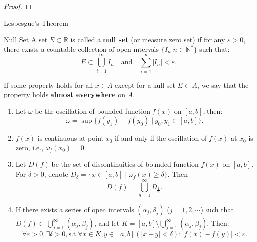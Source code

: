 \documentclass[11pt]{../../TexTemplate/elegantbook}
\begin{document}
\begin{proof}
    
\end{proof}

\begin{leftbarTitle}{Lesbesgue's Theorem}\end{leftbarTitle}
\begin{definition}{Null Set}
    A set \( E \subset \mathbb{R} \) is called a \textbf{null set} (or measure zero set) 
    if for any \( \varepsilon > 0 \), there exists a countable collection of open intervals 
    \( \{ I_{n}|n \in \mathbb{N}^{*} \} \) such that:
    \[
    E \subset \bigcup_{i=1}^{\infty} I_{n} \quad \text{and} \quad \sum_{i=1}^{\infty} |I_{n}| < \varepsilon.
    \]
\end{definition}
If some property holds for all \( x \in A \) except for a null set \( E \subset A \),
we say that the property holds \textbf{almost everywhere} on \( A \).

\begin{lemma}
    \begin{enumerate}
        \item Let \( \omega \) be the oscillation of bounded function \( f(x) \) on \( [a, b] \), then:
            \[
            \omega = \sup \{ f(y_{1}) - f(y_{0}) \mid y_{0}, y_{1} \in [a, b] \}  .
            \]
        \item \(f(x)\) is continuous at point \( x_{0} \) if and only if 
            the oscillation of \( f(x) \) at \( x_{0} \) is zero, i.e., \( \omega_{f}(x_{0}) = 0 \).
        \item Let \(D(f)\) be the set of discontinuities of bounded function \( f(x) \) on \( [a, b] \). 
            For \(\delta > 0\), denote \(D_{\delta}= \{ x \in [a,b] \mid \omega_{f}(x) \geqslant \delta \}\).
            Then 
            \[
            D(f) = \bigcup_{n=1}^{\infty} D_{\frac{1}{n}}.
            \]
        \item If there exists a series of open intervals \( (\alpha_{j}, \beta_{j}) \) (\( j = 1, 2, \cdots \)) 
            such that \(D(f) \subset \bigcup_{j=1}^{\infty} (\alpha_{j}, \beta_{j})\), 
            and let \(K = [a,b]\setminus \bigcup_{j=1}^{\infty} (\alpha_{j}, \beta_{j})\).
            Then:
            \[
            \forall \varepsilon > 0, \exists \delta > 0, \text{s.t.} \forall x \in K, y \in [a,b] (|x - y| < \delta):
            |f(x) - f(y)| < \varepsilon.
            \]
    \end{enumerate}
\end{lemma}
\end{document}
